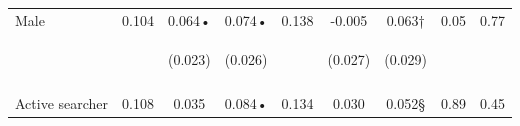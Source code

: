 \begin{tabular}{lcccccccc}
\noalign{\smallskip}Male & 0.104 & 0.064• & 0.074• & 0.138 & -0.005 & 0.063† & 0.05 & 0.77\\
 & \begin{footnotesize}\end{footnotesize} & \begin{footnotesize}(0.023)\end{footnotesize} & \begin{footnotesize}(0.026)\end{footnotesize} & \begin{footnotesize}\end{footnotesize} & \begin{footnotesize}(0.027)\end{footnotesize} & \begin{footnotesize}(0.029)\end{footnotesize} & \begin{footnotesize}\end{footnotesize} & \begin{footnotesize}\end{footnotesize}\\
 & \begin{footnotesize}\end{footnotesize} & \begin{footnotesize}[0.027]\end{footnotesize} & \begin{footnotesize}[0.004]\end{footnotesize} & \begin{footnotesize}\end{footnotesize} & \begin{footnotesize}[1.000]\end{footnotesize} & \begin{footnotesize}[0.068]\end{footnotesize} & \begin{footnotesize}\end{footnotesize} & \begin{footnotesize}\end{footnotesize}\\
\noalign{\smallskip}Active searcher & 0.108 & 0.035 & 0.084• & 0.134 & 0.030 & 0.052§ & 0.89 & 0.45\\

\end{tabular}
